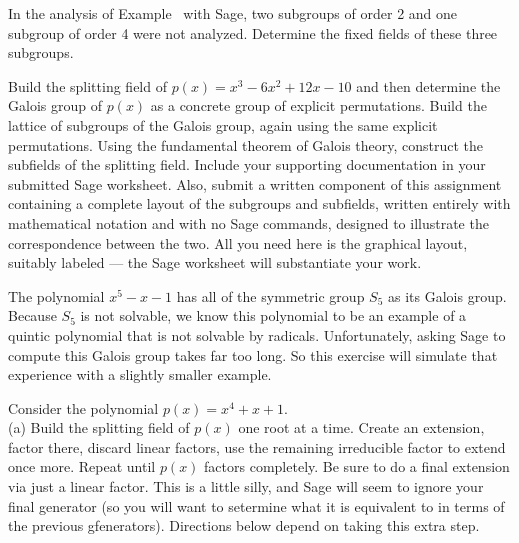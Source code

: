 \begin{sageverbatim}\end{sageverbatim}
%
%
In the analysis of Example~ with Sage, two subgroups of order 2 and one subgroup of order 4 were not analyzed.  Determine the fixed fields of these three subgroups.
\begin{sageverbatim}\end{sageverbatim}
%
%
Build the splitting field of $p(x)=x^3-6x^2+12x-10$ and then determine the Galois group of $p(x)$ as a concrete group of explicit permutations.  Build the lattice of subgroups of the Galois group, again using the same explicit permutations.  Using the fundamental theorem of Galois theory, construct the subfields of the splitting field.  Include your supporting documentation in your submitted Sage worksheet.  Also, submit a written component of this assignment containing a complete layout of the subgroups and subfields, written entirely with mathematical notation and with no Sage commands, designed to illustrate the correspondence between the two.  All you need here is the graphical layout, suitably labeled --- the Sage worksheet will substantiate your work.
\begin{sageverbatim}\end{sageverbatim}
%
%
The polynomial $x^5-x-1$ has all of the symmetric group $S_5$ as its Galois group.  Because $S_5$ is not solvable, we know this polynomial to be an example of a quintic polynomial that is not solvable by radicals.  Unfortunately, asking Sage to compute this Galois group takes far too long.  So this exercise will simulate that experience with a slightly smaller example.\par
%
Consider the polynomial $p(x)=x^4+x+1$.\\
%
(a) Build the splitting field of $p(x)$ one root at a time.  Create an extension, factor there, discard linear factors, use the remaining irreducible factor to extend once more.  Repeat until $p(x)$ factors completely.  Be sure to do a final extension via just a linear factor.  This is a little silly, and Sage will seem to ignore your final generator (so you will want to setermine what it is equivalent to in terms of the previous gfenerators).  Directions below depend on taking this extra step.\\

